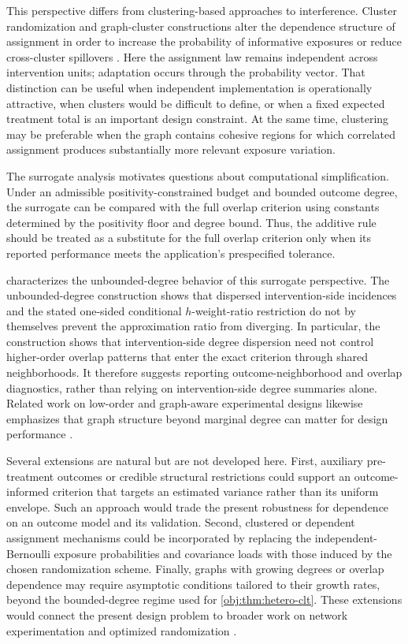 This perspective differs from clustering-based approaches to interference. Cluster randomization and graph-cluster constructions alter the dependence structure of assignment in order to increase the probability of informative exposures or reduce cross-cluster spillovers \citep{EcklesKarrerUgander2017,UganderYin2020RandomizedGCR,BrennanMirrokniPougetAbadie2022ClusterBipartite}. Here the assignment law remains independent across intervention units; adaptation occurs through the probability vector. That distinction can be useful when independent implementation is operationally attractive, when clusters would be difficult to define, or when a fixed expected treatment total is an important design constraint. At the same time, clustering may be preferable when the graph contains cohesive regions for which correlated assignment produces substantially more relevant exposure variation.

The surrogate analysis motivates questions about computational simplification. Under an admissible positivity-constrained budget and bounded outcome degree, the surrogate can be compared with the full overlap criterion using constants determined by the positivity floor and degree bound. Thus, the additive rule should be treated as a substitute for the full overlap criterion only when its reported performance meets the application's prespecified tolerance.

 characterizes the unbounded-degree behavior of this surrogate perspective. The unbounded-degree construction shows that dispersed intervention-side incidences and the stated one-sided conditional \(h\)-weight-ratio restriction do not by themselves prevent the approximation ratio from diverging. In particular, the construction shows that intervention-side degree dispersion need not control higher-order overlap patterns that enter the exact criterion through shared neighborhoods. It therefore suggests reporting outcome-neighborhood and overlap diagnostics, rather than relying on intervention-side degree summaries alone. Related work on low-order and graph-aware experimental designs likewise emphasizes that graph structure beyond marginal degree can matter for design performance \citep{EichhornKhanUganderYu2024LowOrderClusteredDesigns,HarshawSavjeEisenstatMirrokniPougetAbadie2021BipartiteERL}.

Several extensions are natural but are not developed here. First, auxiliary pre-treatment outcomes or credible structural restrictions could support an outcome-informed criterion that targets an estimated variance rather than its uniform envelope. Such an approach would trade the present robustness for dependence on an outcome model and its validation. Second, clustered or dependent assignment mechanisms could be incorporated by replacing the independent-Bernoulli exposure probabilities and covariance loads with those induced by the chosen randomization scheme. Finally, graphs with growing degrees or overlap dependence may require asymptotic conditions tailored to their growth rates, beyond the bounded-degree regime used for \cref{obj:thm:hetero-clt}. These extensions would connect the present design problem to broader work on network experimentation and optimized randomization \citep{UganderYin2020RandomizedGCR,Viviano2026NetworkDesign}.
